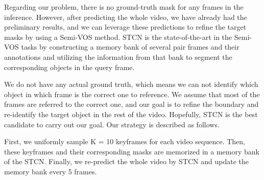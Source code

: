Regarding our problem, there is no ground-truth mask for any frames in the inference. However, after predicting the whole video, we have already had the preliminary results, and we can leverage these predictions to refine the target masks by using a Semi-VOS method. STCN is the state-of-the-art in the Semi-VOS tasks by constructing a memory bank of several pair frames and their annotations and utilizing the information from that bank to segment the corresponding objects in the query frame. 

We do not have any actual ground truth, which means we can not identify which object in which frame is the correct one to reference. We assume that most of the frames are referred to the correct one, and our goal is to refine the boundary and re-identify the target object in the rest of the video. Hopefully, STCN is the best candidate to carry out our goal. Our strategy is described as follows.

First, we uniformly sample K = 10 keyframes for each video sequence.
Then, these keyframes and their corresponding masks are memorized in a memory bank of the STCN\cite{cheng_rethinking_2021}. 
Finally, we re-predict the whole video by STCN and update the memory bank every 5 frames. 